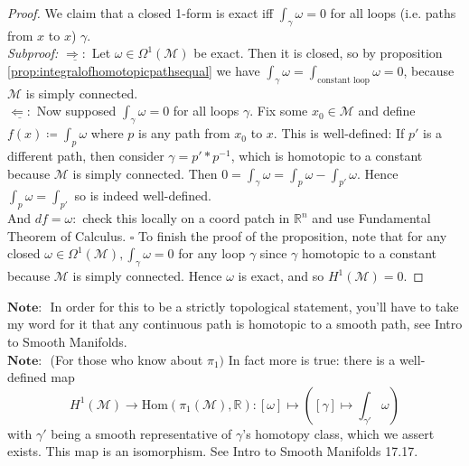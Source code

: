 \documentclass[10pt]{article}
\theoremstyle{plain}
\theoremstyle{definition}
\newenvironment{subproof}{\textit{Subproof:}}{\hfill$\square$}
\newcommand{\Note}{\textbf{Note: }}
\newcommand{\Real}{\mathbb{R}}
\newcommand{\man}{\mathcal{M}}
\newcommand{\Hom}[2]{\text{Hom}\left(#1,#2\right)}
\newcommand{\pformman}[1]{\Omega^{#1}(\man)}
\newcommand{\df}{df}
\newcommand{\cohomman}[1]{H^{#1}(\man)}
\newcommand{\impliesdirection}{\underline{\Rightarrow:}}
\newcommand{\impliedbydirection}{\underline{\Leftarrow:}}
\begin{document}
\begin{proof}
We claim that a closed 1-form is exact iff $\int_\gamma \omega = 0$ for all loops (i.e. paths from $x$ to $x$) $\gamma$.\\
    \begin{subproof}
    $\impliesdirection$ Let $\omega \in \pformman{1}$ be exact. Then it is closed, so by proposition \ref{prop:integralofhomotopicpathsequal} we have $\int_\gamma \omega =  \int_{\text{constant loop}}\omega = 0$, because $\man $ is simply connected.\\
    $\impliedbydirection$ Now supposed $\int_\gamma \omega =0$ for all loops $\gamma$. Fix some $x_0\in \man$ and define $f(x) \coloneqq \int_p \omega$ where $p$ is any path from $x_0$ to $x$. This is well-defined: If $p'$ is a different path, then consider $\gamma = p' * p^{-1}$, which is homotopic to a constant because $\man$ is simply connected. Then $ 0 = \int_\gamma \omega = \int_p \omega - \int_{p'} \omega.$ Hence $\int_p \omega = \int_{p'}$ so is indeed well-defined.\\
    And $\df = \omega :$ check this locally on a coord patch in $\Real^n$ and use Fundamental Theorem of Calculus.
    \end{subproof}
    To finish the proof of the proposition, note that for any closed $\omega\in\pformman{1}, \int_\gamma \omega = 0$ for any loop $\gamma$ since $\gamma$ homotopic to a constant because $\man$ is simply connected. Hence $\omega$ is exact, and so $\cohomman{1} = 0$.
\end{proof}\noindent
$\Note$ In order for this to be a strictly topological statement, you'll have to take my word for it that any continuous path is homotopic to a smooth path, see Intro to Smooth Manifolds.\\
$\Note$ (For those who know about $\pi_1)$ In fact more is true: there is a well-defined map $$\cohomman{1} \to \Hom{\pi_1(\man)}{\Real} : [\omega] \mapsto \left( [\gamma] \mapsto \int_{\gamma'} \omega\right)$$with $\gamma'$ being a smooth representative of $\gamma$'s homotopy class, which we assert exists. This map is an isomorphism. See Intro to Smooth Manifolds 17.17.
\end{document}
